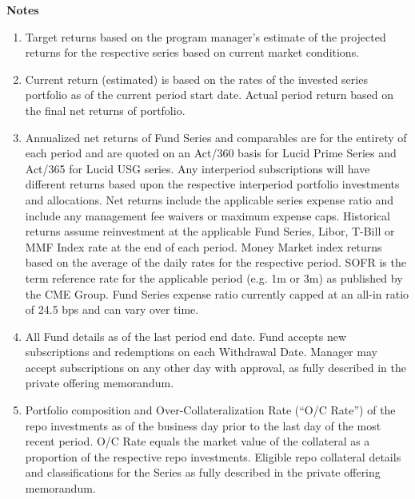 \documentclass[9pt]{article}
\begin{document}
    \pagebreak

    \footnotesize
    \noindent\textbf{\color{lucid_blue}Notes}

    \begin{enumerate}
        \item Target returns based on the program manager's estimate of the projected returns for the respective series based on current market conditions.

        \item Current return (estimated) is based on the rates of the invested series portfolio as of the current period start date. Actual period return based on the final net returns of portfolio.

        \item Annualized net returns of Fund Series and comparables are for the entirety of each period and are quoted on an Act/360 basis for Lucid Prime Series and Act/365 for Lucid USG series. Any interperiod subscriptions will have different returns based upon the respective interperiod portfolio investments and allocations. Net returns include the applicable series expense ratio and include any management fee waivers or maximum expense caps. Historical returns assume reinvestment at the applicable Fund Series, Libor, T-Bill or MMF Index rate at the end of each period. Money Market index returns based on the average of the daily rates for the respective period. SOFR is the term reference rate for the applicable period (e.g. 1m or 3m) as published by the CME Group. Fund Series expense ratio currently capped at an all-in ratio of 24.5 bps and can vary over time.

        \item All Fund details as of the last period end date. Fund accepts new subscriptions and redemptions on each Withdrawal Date. Manager may accept subscriptions on any other day with approval, as fully described in the private offering memorandum.

        \item Portfolio composition and Over-Collateralization Rate (``O/C Rate'') of the repo investments as of the business day prior to the last day of the most recent period. O/C Rate equals the market value of the collateral as a proportion of the respective repo investments. Eligible repo collateral details and classifications for the Series as fully described in the private offering memorandum.

    \end{enumerate}
\end{document}
